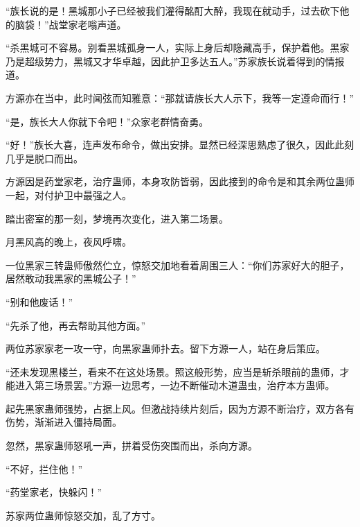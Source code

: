 \begin{this_body}
“族长说的是！黑城那小子已经被我们灌得酩酊大醉，我现在就动手，过去砍下他的脑袋！”战堂家老嗡声道。

“杀黑城可不容易。别看黑城孤身一人，实际上身后却隐藏高手，保护着他。黑家乃是超级势力，黑城又才华卓越，因此护卫多达五人。”苏家族长说着得到的情报道。

方源亦在当中，此时闻弦而知雅意：“那就请族长大人示下，我等一定遵命而行！”

“是，族长大人你就下令吧！”众家老群情奋勇。

“好！”族长大喜，连声发布命令，做出安排。显然已经深思熟虑了很久，因此此刻几乎是脱口而出。

方源因是药堂家老，治疗蛊师，本身攻防皆弱，因此接到的命令是和其余两位蛊师一起，对付护卫中最强之人。

踏出密室的那一刻，梦境再次变化，进入第二场景。

月黑风高的晚上，夜风呼啸。

一位黑家三转蛊师傲然伫立，惊怒交加地看着周围三人：“你们苏家好大的胆子，居然敢动我黑家的黑城公子！”

“别和他废话！”

“先杀了他，再去帮助其他方面。”

两位苏家家老一攻一守，向黑家蛊师扑去。留下方源一人，站在身后策应。

“还未发现黑楼兰，看来不在这处场景。照这般形势，应当是斩杀眼前的蛊师，才能进入第三场景罢。”方源一边思考，一边不断催动木道蛊虫，治疗本方蛊师。

起先黑家蛊师强势，占据上风。但激战持续片刻后，因为方源不断治疗，双方各有伤势，渐渐进入僵持局面。

忽然，黑家蛊师怒吼一声，拼着受伤突围而出，杀向方源。

“不好，拦住他！”

“药堂家老，快躲闪！”

苏家两位蛊师惊怒交加，乱了方寸。

\end{this_body}

